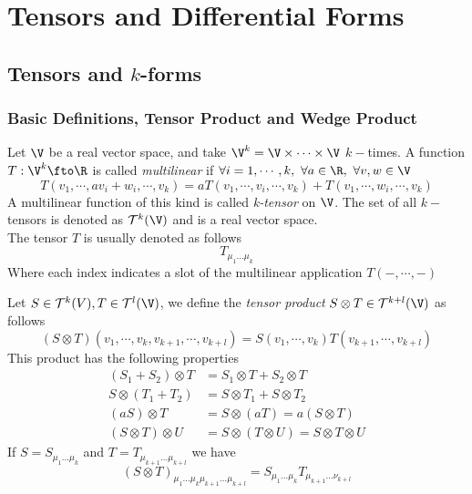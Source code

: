 \documentclass[../mmf.tex]{subfiles}
\begin{document}
\section{Tensors and Differential Forms}
\subsection{Tensors and $k$-forms}
\subsubsection{Basic Definitions, Tensor Product and Wedge Product}
\begin{dfn}
	Let $\V$ be a real vector space, and take $\V^k=\V\times\cdots\times\V$ $k-$times. A function $T:\V^k\fto\R$ is called \textit{multilinear} if $\forall i=1,\cdots,k,\ \forall a\in\R,\ \forall v,w\in\V$
	\begin{equation}
		T(v_1,\cdots,av_i+w_i,\cdots,v_k)=aT(v_1,\cdots,v_i,\cdots,v_k)+T(v_1,\cdots,w_i,\cdots,v_k)
		\label{eq:multilinearapp}
	\end{equation}
	A multilinear function of this kind is called \textit{k-tensor} on $\V$. The set of all $k-$tensors is denoted as $\mathcal{T}^k(\V)$ and is a real vector space.\\
	The tensor $T$ is usually denoted as follows
	\begin{equation}
		T_{\mu_1\ldots\mu_k}
		\label{eq:ktensordef}
	\end{equation}
	Where each index indicates a slot of the multilinear application $T(-,\cdots,-)$
\end{dfn}
\begin{dfn}
	Let $S\in\mathcal{T}^k(V),T\in\mathcal{T}^l(\V)$, we define the \textit{tensor product} $S\otimes T\in\mathcal{T}^{k+l}(\V)$ as follows
	\begin{equation}
		(S\otimes T)(v_1,\cdots,v_k,v_{k+1},\cdots,v_{k+l})=S(v_1,\cdots,v_k)T(v_{k+1},\cdots,v_{k+l})
		\label{eq:tensorprod}
	\end{equation}
	This product has the following properties
	\begin{equation}
		\begin{aligned}
			\left( S_1+S_2 \right)\otimes T&=S_1\otimes T+S_2\otimes T\\
			S\otimes(T_1+T_2)&=S\otimes T_1+S\otimes T_2\\
			(aS)\otimes T&=S\otimes(aT)=a(S\otimes T)\\
			(S\otimes T)\otimes U&= S\otimes(T\otimes U)=S\otimes T\otimes U
		\end{aligned}
		\label{eq:properties}
	\end{equation}
	If $S=S_{\mu_1\ldots\mu_k}$ and $T=T_{\mu_{k+1}\ldots\mu_{k+l}}$ we have
	\begin{equation}
		(S\otimes T)_{\mu_1\ldots\mu_k\mu_{k+1}\ldots\mu_{k+l}}=S_{\mu_1\ldots\mu_k}T_{\mu_{k+1}\ldots\nu_{k+l}}
		\label{eq:tensorprodein}
	\end{equation}
\end{dfn}
\end{document}
